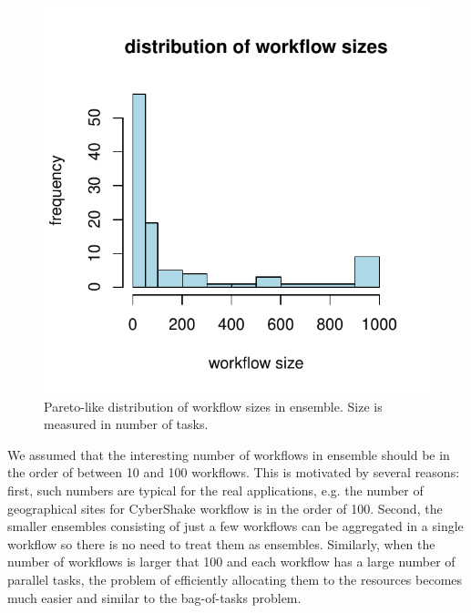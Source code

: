 \documentclass{sig-alternate}
\begin{document}
\begin{figure}[tb] 
\centering
\includegraphics[width=0.6\columnwidth]{figures/ensemble-pareto}
\caption{Pareto-like distribution of workflow sizes in ensemble. Size is
measured in number of tasks.}
\label{fig:ensemble-distribution}
\end{figure}



We assumed that the interesting number of workflows in ensemble should be in the
order of between 10 and 100 workflows. This is motivated by several reasons:
first, such numbers are typical for the real applications, e.g. the number of geographical sites for
CyberShake workflow is in the order of 100. Second, the smaller ensembles
consisting of just a few workflows can be aggregated in a single workflow so
there is no need to treat them as ensembles. Similarly, when the number of
workflows is larger that 100 and each workflow has a large number of parallel
tasks, the problem of efficiently allocating them to the resources becomes much
easier and similar to the bag-of-tasks problem.
\end{document}
